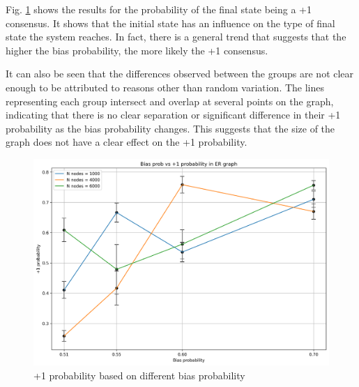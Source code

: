 \documentclass[conference]{IEEEtran}
\begin{document}
        Fig. \ref{fig:er_consensus} shows the results for the probability of the final state being a +1 consensus. 
        It shows that the initial state has an influence on the type of final state the system reaches. 
        In fact, there is a general trend that suggests that the higher the bias probability, the more likely the +1 consensus.
        
        It can also be seen that the differences observed between the groups are not clear enough to be attributed to reasons other than random variation. 
        The lines representing each group intersect and overlap at several points on the graph, indicating that there is no clear separation or significant difference in their +1 probability as the bias probability changes. 
        This suggests that the size of the graph does not have a clear effect on the +1 probability.

        \begin{figure}[!ht]
            \centering
            \includegraphics[width=\columnwidth]{media/er_consensus.png}
            \caption[short]{+1 probability based on different bias probability}
            \label{fig:er_consensus}
        \end{figure}

\end{document}
